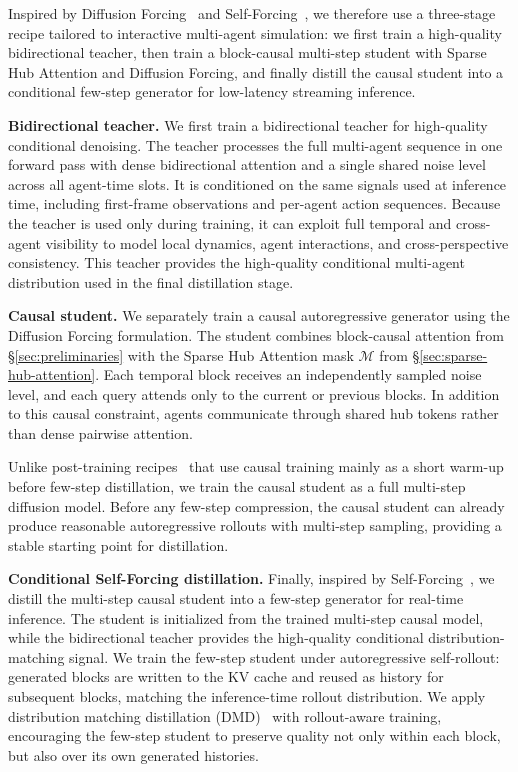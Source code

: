 Inspired by Diffusion Forcing~\cite{chen2024diffusion} and Self-Forcing~\cite{huang2025self}, we therefore use a three-stage recipe tailored to interactive multi-agent simulation: we first train a high-quality bidirectional teacher, then train a block-causal multi-step student with Sparse Hub Attention and Diffusion Forcing, and finally distill the causal student into a conditional few-step generator for low-latency streaming inference.



\noindent\textbf{Bidirectional teacher.}
We first train a bidirectional teacher for high-quality conditional denoising.
The teacher processes the full multi-agent sequence in one forward pass with dense bidirectional attention and a single shared noise level across all agent-time slots.
It is conditioned on the same signals used at inference time, including first-frame observations and per-agent action sequences.
Because the teacher is used only during training, it can exploit full temporal and cross-agent visibility to model local dynamics, agent interactions, and cross-perspective consistency.
This teacher provides the high-quality conditional multi-agent distribution used in the final distillation stage.

\noindent\textbf{Causal student.}
We separately train a causal autoregressive generator using the Diffusion Forcing formulation. 
The student combines block-causal attention from \S\ref{sec:preliminaries} with the Sparse Hub Attention mask $\mathcal{M}$ from \S\ref{sec:sparse-hub-attention}.
Each temporal block receives an independently sampled noise level, and each query attends only to the current or previous blocks.
In addition to this causal constraint, agents communicate through shared hub tokens rather than dense pairwise attention.

Unlike post-training recipes~\cite{huang2025self,yin2025slow} that use causal training mainly as a short warm-up before few-step distillation, we train the causal student as a full multi-step diffusion model. Before any few-step compression, the causal student can already produce reasonable autoregressive rollouts with multi-step sampling, providing a stable starting point for distillation.


\noindent\textbf{Conditional Self-Forcing distillation.}
Finally, inspired by Self-Forcing~\cite{huang2025self}, we distill the multi-step causal student into a few-step generator for real-time inference.
The student is initialized from the trained multi-step causal model, while the bidirectional teacher provides the high-quality conditional distribution-matching signal.
We train the few-step student under autoregressive self-rollout: generated blocks are written to the KV cache and reused as history for subsequent blocks, matching the inference-time rollout distribution.
We apply distribution matching distillation (DMD)~\cite{yin2024one} with rollout-aware training, encouraging the few-step student to preserve quality not only within each block, but also over its own generated histories.

